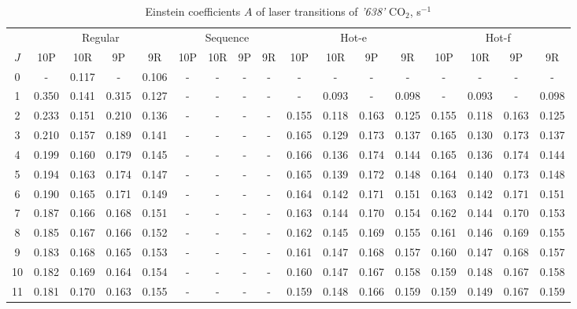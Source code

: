 \documentclass{report}
\begin{document}
\begin{appendices}
\begin{sidewaystable}
\centering
\caption{Einstein coefficients $A$ of laser transitions of \textit{'638'} {CO$_2$}, s$^{-1}$}
\label{table:A638}
\scriptsize
\begin{tabular}{|c|cccc|cccc|cccc|cccc|}
\hline
& \multicolumn{4}{c|}{Regular}& \multicolumn{4}{c|}{Sequence}& \multicolumn{4}{c|}{Hot-e}& \multicolumn{4}{c|}{Hot-f}\\
$J$ & 10P & 10R & 9P & 9R & 10P & 10R & 9P & 9R & 10P & 10R & 9P & 9R & 10P & 10R & 9P & 9R\\ 
\hline
0  &   -   & 0.117 &   -   & 0.106 &   -   &   -   &   -   &   -   &   -   &   -   &   -   &   -   &   -   &   -   &   -   &   -  \\
1  & 0.350 & 0.141 & 0.315 & 0.127 &   -   &   -   &   -   &   -   &   -   & 0.093 &   -   & 0.098 &   -   & 0.093 &   -   & 0.098\\
2  & 0.233 & 0.151 & 0.210 & 0.136 &   -   &   -   &   -   &   -   & 0.155 & 0.118 & 0.163 & 0.125 & 0.155 & 0.118 & 0.163 & 0.125\\
3  & 0.210 & 0.157 & 0.189 & 0.141 &   -   &   -   &   -   &   -   & 0.165 & 0.129 & 0.173 & 0.137 & 0.165 & 0.130 & 0.173 & 0.137\\
4  & 0.199 & 0.160 & 0.179 & 0.145 &   -   &   -   &   -   &   -   & 0.166 & 0.136 & 0.174 & 0.144 & 0.165 & 0.136 & 0.174 & 0.144\\
5  & 0.194 & 0.163 & 0.174 & 0.147 &   -   &   -   &   -   &   -   & 0.165 & 0.139 & 0.172 & 0.148 & 0.164 & 0.140 & 0.173 & 0.148\\
6  & 0.190 & 0.165 & 0.171 & 0.149 &   -   &   -   &   -   &   -   & 0.164 & 0.142 & 0.171 & 0.151 & 0.163 & 0.142 & 0.171 & 0.151\\
7  & 0.187 & 0.166 & 0.168 & 0.151 &   -   &   -   &   -   &   -   & 0.163 & 0.144 & 0.170 & 0.154 & 0.162 & 0.144 & 0.170 & 0.153\\
8  & 0.185 & 0.167 & 0.166 & 0.152 &   -   &   -   &   -   &   -   & 0.162 & 0.145 & 0.169 & 0.155 & 0.161 & 0.146 & 0.169 & 0.155\\
9  & 0.183 & 0.168 & 0.165 & 0.153 &   -   &   -   &   -   &   -   & 0.161 & 0.147 & 0.168 & 0.157 & 0.160 & 0.147 & 0.168 & 0.157\\
10 & 0.182 & 0.169 & 0.164 & 0.154 &   -   &   -   &   -   &   -   & 0.160 & 0.147 & 0.167 & 0.158 & 0.159 & 0.148 & 0.167 & 0.158\\
11 & 0.181 & 0.170 & 0.163 & 0.155 &   -   &   -   &   -   &   -   & 0.159 & 0.148 & 0.166 & 0.159 & 0.159 & 0.149 & 0.167 & 0.159\\

\end{tabular}
\end{sidewaystable}
\end{appendices}
\end{document}
